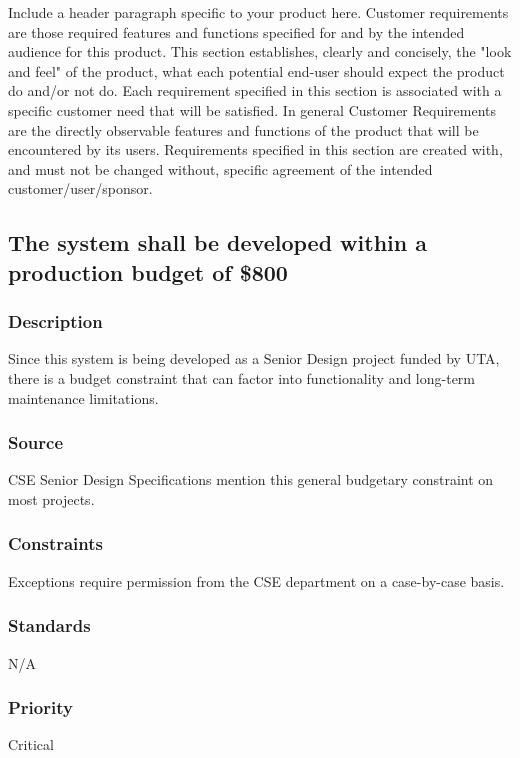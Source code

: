 Include a header paragraph specific to your product here. Customer requirements are those required features and functions specified for and by the intended audience for this product. This section establishes, clearly and concisely, the "look and feel" of the product, what each potential end-user should expect the product do and/or not do. Each requirement specified in this section is associated with a specific customer need that will be satisfied. In general Customer Requirements are the directly observable features and functions of the product that will be encountered by its users. Requirements specified in this section are created with, and must not be changed without, specific agreement of the intended customer/user/sponsor.

\subsection{The system shall be developed within a production budget of \$800}
\subsubsection{Description}
Since this system is being developed as a Senior Design project funded by UTA, there is a budget constraint that can factor into functionality and long-term maintenance limitations.
\subsubsection{Source}
CSE Senior Design Specifications mention this general budgetary constraint on most projects. 
\subsubsection{Constraints}
Exceptions require permission from the CSE department on a case-by-case basis.
\subsubsection{Standards}
N/A
\subsubsection{Priority}
Critical
